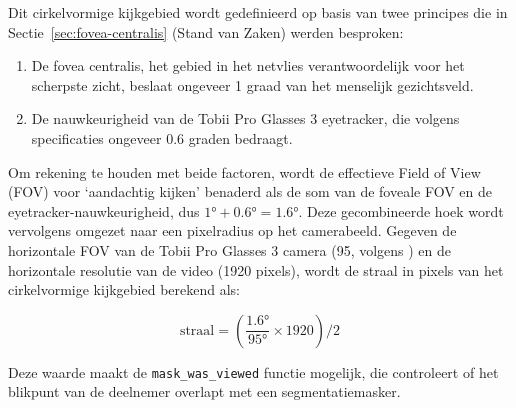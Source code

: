 Dit cirkelvormige kijkgebied wordt gedefinieerd op basis van twee principes die in 
Sectie~\ref{sec:fovea-centralis} (Stand van Zaken) werden besproken:
\begin{enumerate}
    \item De fovea centralis, het gebied in het netvlies verantwoordelijk voor het scherpste zicht, beslaat ongeveer 1 graad van het menselijk gezichtsveld.
    \item De nauwkeurigheid van de Tobii Pro Glasses 3 eyetracker, die volgens specificaties ongeveer 0.6 graden bedraagt.
\end{enumerate}

Om rekening te houden met beide factoren, wordt de effectieve Field of View (FOV) voor 
`aandachtig kijken' benaderd als de som van de foveale FOV en de eyetracker-nauwkeurigheid, dus \(1° + 0.6° = 1.6° \).
Deze gecombineerde hoek wordt vervolgens omgezet naar een pixelradius op het camerabeeld. 
Gegeven de horizontale FOV van de Tobii Pro Glasses 3 camera (95\textdegree, volgens \textcite{Tobii2025a}) en de horizontale resolutie van de video (1920 pixels),
wordt de straal in pixels van het cirkelvormige kijkgebied berekend als:

\[
\text{straal} = \left( \frac{\text{1.6°}}{\text{95°}} \times \text{1920} \right) / 2
\]

Deze waarde maakt de \texttt{mask\_was\_viewed} functie mogelijk, die controleert of het blikpunt van de deelnemer overlapt met een segmentatiemasker.

